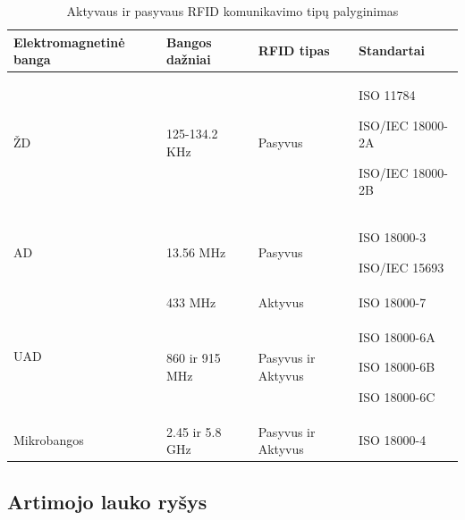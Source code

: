 \begin{table}[!ht]
    \centering
    \caption{Aktyvaus ir pasyvaus RFID komunikavimo tipų palyginimas}
    \renewcommand{\arraystretch}{1,5}
    \begin{tabular}{m{9em}m{8em}m{8em}m{8em}} 
        \hline
        Elektromagnetinė banga            & Bangos dažniai    & RFID tipas    &Standartai   \\ 
        \hline
        ŽD                     & 125-134.2 KHz & Pasyvus & ISO 11784 \par ISO/IEC 18000-2A \par ISO/IEC 18000-2B   \\ 
        \hline
        AD                     & 13.56 MHz & Pasyvus  &  ISO 18000-3 \par ISO/IEC 15693 \\ 
        \hline
        \multirow{2}{*}{UAD} & 433 MHz       & Aktyvus   &  ISO 18000-7    \\ 
        \cline{2-4}
                                & 860 ir 915 MHz      &  Pasyvus ir Aktyvus  &  ISO 18000-6A \par ISO 18000-6B \par ISO 18000-6C    \\ 
        \hline
        Mikrobangos                       & 2.45 ir 5.8 GHz         & Pasyvus ir Aktyvus &  ISO 18000-4  \\
        \hline
    \end{tabular}
\end{table}

\subsection{Artimojo lauko ryšys}
